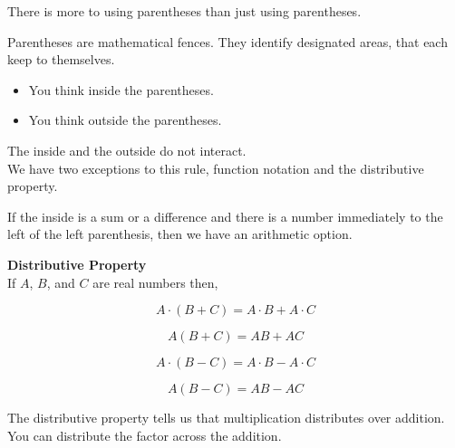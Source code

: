 \documentclass{ximera}
\begin{document}
There is more to using parentheses than just using parentheses. \\





Parentheses are mathematical fences.  They identify designated areas, that each keep to themselves. \\

\begin{itemize}
\item You think inside the parentheses. 
\item You think outside the parentheses. 
\end{itemize}



The inside and the outside do not interact. \\


We have two exceptions to this rule, function notation and the distributive property. \\














If the inside is a sum or a difference and there is a number immediately to the left of the left parenthesis, then we have an arithmetic option.


\begin{notation}  \textbf{\textcolor{blue!55!black}{Distributive Property}} \\


If $A$, $B$, and $C$ are real numbers then,

\[
A \cdot (B + C) = A \cdot B + A \cdot C
\]


\[
A (B + C) = A  B + A  C
\]


\[
A \cdot (B - C) = A \cdot B - A \cdot C
\]


\[
A (B - C) = A  B - A  C
\]




\end{notation}


The distributive property tells us that multiplication distributes over addition.  You can distribute the factor across the addition. \\
\end{document}
